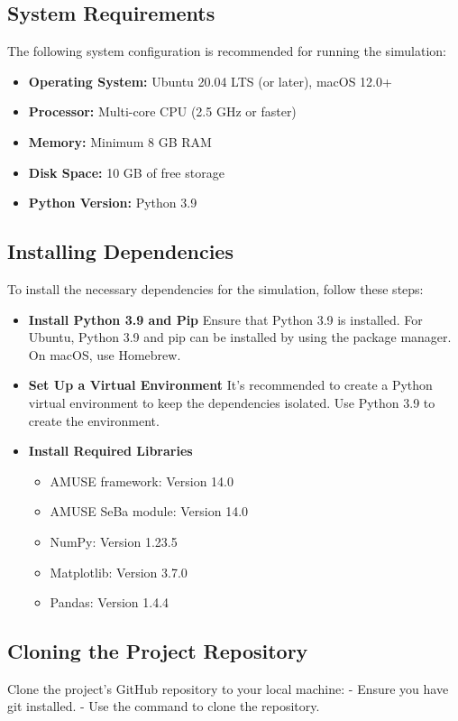 \documentclass[10pt,twocolumn]{article}
\begin{document}
\subsection{System Requirements}
The following system configuration is recommended for running the simulation:
\begin{itemize}
    \item \textbf{Operating System:} Ubuntu 20.04 LTS (or later), macOS 12.0+
    \item \textbf{Processor:} Multi-core CPU (2.5 GHz or faster)
    \item \textbf{Memory:} Minimum 8 GB RAM
    \item \textbf{Disk Space:} 10 GB of free storage
    \item \textbf{Python Version:} Python 3.9
\end{itemize}

\subsection{Installing Dependencies}
To install the necessary dependencies for the simulation, follow these steps:

\begin{itemize}
    \item \textbf{Install Python 3.9 and Pip}
       Ensure that Python 3.9 is installed. For Ubuntu, Python 3.9 and pip can be installed by using the package manager. On macOS, use Homebrew.
    \item \textbf{Set Up a Virtual Environment}
       It's recommended to create a Python virtual environment to keep the dependencies isolated. Use Python 3.9 to create the environment.
    \item \textbf{Install Required Libraries}
    \begin{itemize}
        \item AMUSE framework: Version 14.0
        \item AMUSE SeBa module: Version 14.0
        \item NumPy: Version 1.23.5
        \item Matplotlib: Version 3.7.0
        \item Pandas: Version 1.4.4
    \end{itemize}
\end{itemize}

\subsection{Cloning the Project Repository}
Clone the project’s GitHub repository to your local machine:
- Ensure you have git installed.
- Use the command to clone the repository.
\end{document}
